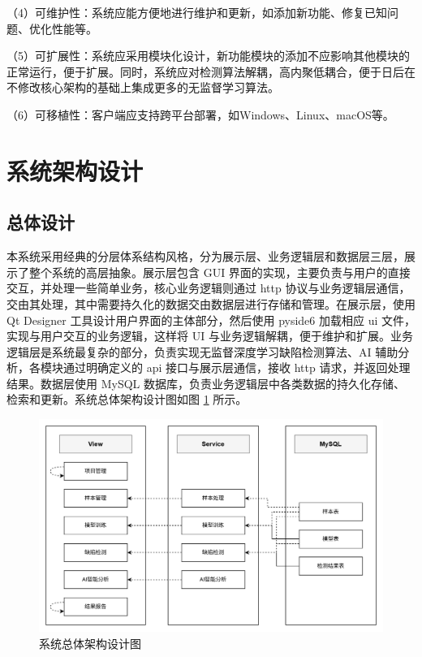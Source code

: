 \documentclass[
  ]{njuthesis}
\begin{document}
（4）可维护性：系统应能方便地进行维护和更新，如添加新功能、修复已知问题、优化性能等。

（5）可扩展性：系统应采用模块化设计，新功能模块的添加不应影响其他模块的正常运行，便于扩展。同时，系统应对检测算法解耦，高内聚低耦合，便于日后在不修改核心架构的基础上集成更多的无监督学习算法。

（6）可移植性：客户端应支持跨平台部署，如Windows、Linux、macOS等。

\section{系统架构设计}

\subsection{总体设计}

本系统采用经典的分层体系结构风格，分为展示层、业务逻辑层和数据层三层，展示了整个系统的高层抽象。展示层包含 GUI 界面的实现，主要负责与用户的直接交互，并处理一些简单业务，核心业务逻辑则通过 http 协议与业务逻辑层通信，交由其处理，其中需要持久化的数据交由数据层进行存储和管理。在展示层，使用 Qt Designer 工具设计用户界面的主体部分，然后使用 pyside6 加载相应 ui 文件，实现与用户交互的业务逻辑，这样将 UI 与业务逻辑解耦，便于维护和扩展。业务逻辑层是系统最复杂的部分，负责实现无监督深度学习缺陷检测算法、AI 辅助分析，各模块通过明确定义的 api 接口与展示层通信，接收 http 请求，并返回处理结果。数据层使用 MySQL 数据库，负责业务逻辑层中各类数据的持久化存储、检索和更新。系统总体架构设计图如图 \ref{系统总体架构设计图} 所示。

\begin{figure}[htb]
    \centering
    \includegraphics[width=\textwidth]{images/系统总体架构设计图.png}
    \caption{系统总体架构设计图}
    \label{系统总体架构设计图}
\end{figure}
\end{document}

